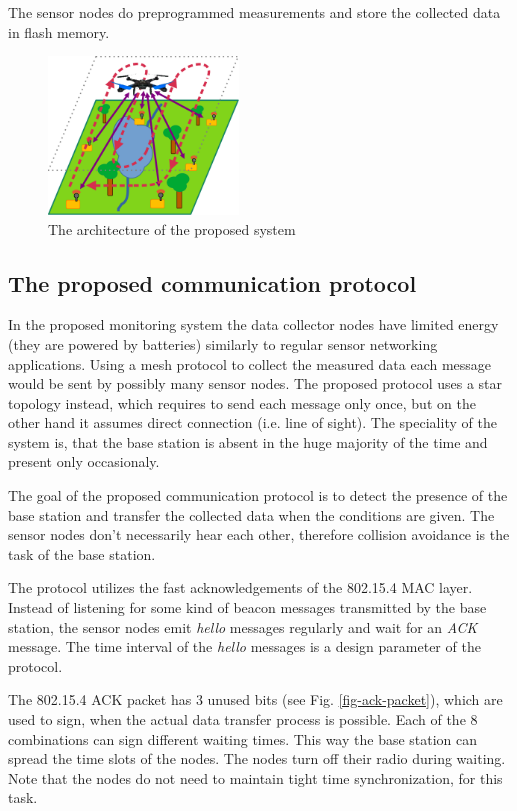 \documentclass[conference]{IEEEtran}
\begin{document}
The sensor nodes do preprogrammed measurements and store the collected data
in flash memory. 

\begin{figure}[htbp]
	\centering
	\includegraphics[width=0.45\textwidth]{fig/area.png}
  \caption{The architecture of the proposed system}
	\label{fig-area}
\end{figure}

\subsection{The proposed communication protocol}

In the proposed monitoring system the data collector nodes have limited
energy (they are powered by batteries) similarly to regular sensor networking
applications. Using a mesh protocol to collect the measured data each message
would be sent by possibly many sensor nodes. The proposed protocol uses a star
topology instead, which requires to send each message only once, but on the
other hand it assumes direct connection (i.e. line of sight).
The speciality of the system is, that the base station is absent in the huge
majority of the time and present only occasionaly.

The goal of the proposed communication protocol is to detect the presence
of the base station and transfer the collected data when the conditions are
given. The sensor nodes don't necessarily hear each other, therefore collision
avoidance is the task of the base station.

The protocol utilizes the fast acknowledgements of the 802.15.4 MAC layer.
Instead of listening for some kind of beacon messages transmitted by the
base station, the sensor nodes emit \emph{hello} messages
regularly and wait for an \emph{ACK} message.
The time interval of the \emph{hello} messages is a design parameter of
the protocol.

The 802.15.4 ACK packet has 3 unused bits (see Fig. \ref{fig-ack-packet}), which
are used to sign, when the actual data transfer process is possible.
Each of the 8 combinations can sign different waiting times. This way
the base station can spread the time slots of the nodes. The nodes turn off
their radio during waiting. Note that the nodes do not need to maintain tight
time synchronization, for this task.
\end{document}
